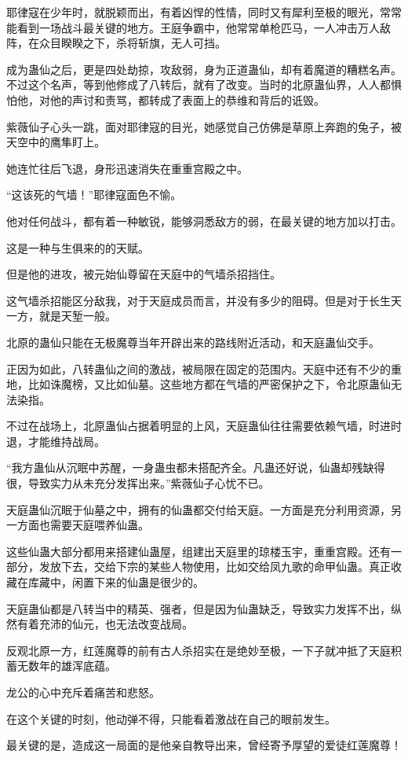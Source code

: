 \begin{this_body}
耶律寇在少年时，就脱颖而出，有着凶悍的性情，同时又有犀利至极的眼光，常常能看到一场战斗最关键的地方。王庭争霸中，他常常单枪匹马，一人冲击万人敌阵，在众目睽睽之下，杀将斩旗，无人可挡。

成为蛊仙之后，更是四处劫掠，攻敌弱，身为正道蛊仙，却有着魔道的糟糕名声。不过这个名声，等到他修成了八转后，就有了改变。当时的北原蛊仙界，人人都惧怕他，对他的声讨和责骂，都转成了表面上的恭维和背后的诋毁。

紫薇仙子心头一跳，面对耶律寇的目光，她感觉自己仿佛是草原上奔跑的兔子，被天空中的鹰隼盯上。

她连忙往后飞退，身形迅速消失在重重宫殿之中。

“这该死的气墙！”耶律寇面色不愉。

他对任何战斗，都有着一种敏锐，能够洞悉敌方的弱，在最关键的地方加以打击。

这是一种与生俱来的的天赋。

但是他的进攻，被元始仙尊留在天庭中的气墙杀招挡住。

这气墙杀招能区分敌我，对于天庭成员而言，并没有多少的阻碍。但是对于长生天一方，就是天堑一般。

北原的蛊仙只能在无极魔尊当年开辟出来的路线附近活动，和天庭蛊仙交手。

正因为如此，八转蛊仙之间的激战，被局限在固定的范围内。天庭中还有不少的重地，比如诛魔榜，又比如仙墓。这些地方都在气墙的严密保护之下，令北原蛊仙无法染指。

不过在战场上，北原蛊仙占据着明显的上风，天庭蛊仙往往需要依赖气墙，时进时退，才能维持战局。

“我方蛊仙从沉眠中苏醒，一身蛊虫都未搭配齐全。凡蛊还好说，仙蛊却残缺得很，导致实力从未充分发挥出来。”紫薇仙子心忧不已。

天庭蛊仙沉眠于仙墓之中，拥有的仙蛊都交付给天庭。一方面是充分利用资源，另一方面也需要天庭喂养仙蛊。

这些仙蛊大部分都用来搭建仙蛊屋，组建出天庭里的琼楼玉宇，重重宫殿。还有一部分，发放下去，交给下宗的某些人物使用，比如交给凤九歌的命甲仙蛊。真正收藏在库藏中，闲置下来的仙蛊是很少的。

天庭蛊仙都是八转当中的精英、强者，但是因为仙蛊缺乏，导致实力发挥不出，纵然有着充沛的仙元，也无法改变战局。

反观北原一方，红莲魔尊的前有古人杀招实在是绝妙至极，一下子就冲抵了天庭积蓄无数年的雄浑底蕴。

龙公的心中充斥着痛苦和悲怒。

在这个关键的时刻，他动弹不得，只能看着激战在自己的眼前发生。

最关键的是，造成这一局面的是他亲自教导出来，曾经寄予厚望的爱徒红莲魔尊！

\end{this_body}

